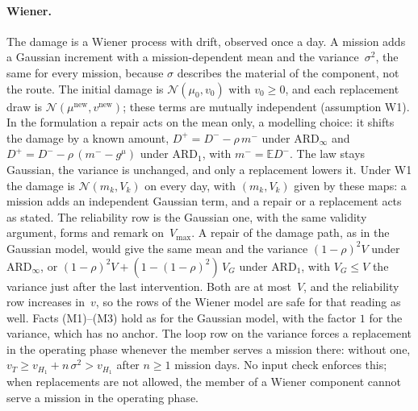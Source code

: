 \documentclass[11pt,a4paper]{article}
\theoremstyle{plain}
\theoremstyle{definition}
\theoremstyle{remark}
\begin{document}
\paragraph{Wiener.}
The damage is a Wiener process with drift, observed once a day.
A mission adds a Gaussian increment with a mission-dependent mean and the variance~$\sigma^2$, the same for every mission, because $\sigma$ describes the material of the component, not the route.
The initial damage is $\mathcal{N}(\mu_0, v_0)$ with $v_0 \ge 0$, and each replacement draw is $\mathcal{N}(\mu^{\mathrm{new}}, v^{\mathrm{new}})$; these terms are mutually independent (assumption W1).
In the formulation a repair acts on the mean only, a modelling choice: it shifts the damage by a known amount, $D^+ = D^- - \rho\, m^-$ under $\text{ARD}_\infty$ and $D^+ = D^- - \rho\,(m^- - g^{\mu})$ under $\text{ARD}_1$, with $m^- = \mathbb{E}D^-$.
The law stays Gaussian, the variance is unchanged, and only a replacement lowers it.
Under W1 the damage is $\mathcal{N}(m_k, V_k)$ on every day, with $(m_k, V_k)$ given by these maps: a mission adds an independent Gaussian term, and a repair or a replacement acts as stated.
The reliability row is the Gaussian one, with the same validity argument, forms and remark on~$V_{\max}$.
A repair of the damage path, as in the Gaussian model, would give the same mean and the variance $(1-\rho)^2 V$ under $\text{ARD}_\infty$, or $(1-\rho)^2 V + (1 - (1-\rho)^2)\,V_G$ under $\text{ARD}_1$, with $V_G \le V$ the variance just after the last intervention.
Both are at most~$V$, and the reliability row increases in~$v$, so the rows of the Wiener model are safe for that reading as well.
Facts (M1)--(M3) hold as for the Gaussian model, with the factor $1$ for the variance, which has no anchor.
The loop row on the variance forces a replacement in the operating phase whenever the member serves a mission there: without one, $v_T \ge v_{H_1} + n\,\sigma^2 > v_{H_1}$ after $n \ge 1$ mission days.
No input check enforces this; when replacements are not allowed, the member of a Wiener component cannot serve a mission in the operating phase.
\end{document}
